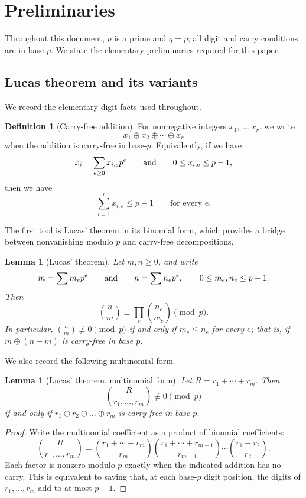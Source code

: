 \documentclass[11pt]{amsart}
\newtheorem{lemma}[theorem]{Lemma}
\theoremstyle{definition}
\newtheorem*{definition}{Definition}
\begin{document}
\section{Preliminaries}
Throughout this document, $p$ is a prime and $q=p$;
all digit and carry conditions are in base $p$.
We state the elementary preliminaries required for this paper.

\subsection{Lucas theorem and its variants}
We record the elementary digit facts used throughout.

\begin{definition}[Carry-free addition]\label{def:carryfree}
For nonnegative integers $x_1,\ldots,x_r$, we write
\[
  x_1\oplus x_2\oplus\cdots\oplus x_r
\]
when the addition is carry-free in base-$p$.  Equivalently, if we have
\[
  x_i=\sum_{e\geq 0}x_{i,e}p^e
  \qquad {\text {\rm and}}\qquad 0\leq x_{i,e}\leq p-1,
\]
then we have
\[
  \sum_{i=1}^r x_{i,e}\leq p-1
  \qquad\text{for every }e.
\]
\end{definition}

The first tool is Lucas' theorem in its binomial form,
which provides a bridge between nonvanishing modulo $p$ and carry-free decompositions.

\begin{lemma}[Lucas' theorem]\label{lem:Lucas-binomial}
Let $m,n\geq 0$, and write
\[
  m=\sum m_ep^e\qquad {\text {\rm and}}\qquad n=\sum n_ep^e,
  \qquad 0\leq m_e,n_e\leq p-1.
\]
Then
\[
  \binom{n}{m}\equiv\prod_e\binom{n_e}{m_e}\pmod p.
\]
In particular, $\binom{n}{m}\not\equiv 0\pmod p$ if and only if $m_e\leq n_e$ for every $e$;
that is, if $m \oplus (n-m)$ is carry-free in base $p$.
\end{lemma}

We also record the following multinomial form.

\begin{lemma}[Lucas' theorem, multinomial form]\label{lem:mult-Lucas}
Let $R=r_1+\cdots+r_m$.  Then
\[
  \binom{R}{r_1,\ldots,r_m}\not\equiv 0\pmod p
\]
if and only if $r_1 \oplus r_2 \oplus \dots \oplus r_m$ is carry-free in base-$p$.
\end{lemma}

\begin{proof}
Write the multinomial coefficient as a product of binomial coefficients:
\[
  \binom{R}{r_1,\ldots,r_m}
  =\binom{r_1+\cdots+r_m}{r_m}
   \binom{r_1+\cdots+r_{m-1}}{r_{m-1}}\cdots
   \binom{r_1+r_2}{r_2}.
\]
Each factor is nonzero modulo $p$ exactly when the indicated addition has no carry.
This is equivalent to saying that, at each base-$p$ digit position,
the digits of $r_1,\ldots,r_m$ add to at most $p-1$.
\end{proof}
\end{document}
